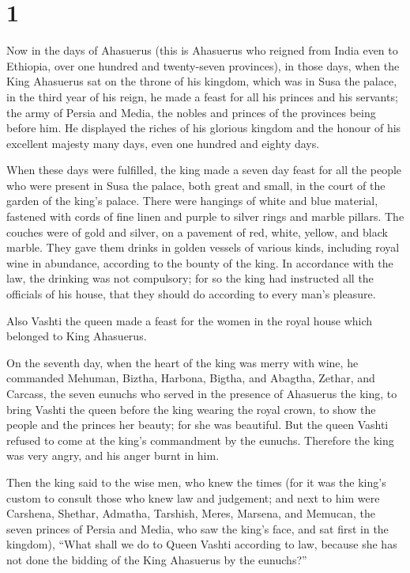 \hypertarget{section}{%
\section{1}\label{section}}

 Now in the days of Ahasuerus (this is Ahasuerus who
reigned from India even to Ethiopia, over one hundred and twenty-seven
provinces),  in those days, when the King Ahasuerus sat on
the throne of his kingdom, which was in Susa the palace, 
in the third year of his reign, he made a feast for all his princes and
his servants; the army of Persia and Media, the nobles and princes of
the provinces being before him.  He displayed the riches
of his glorious kingdom and the honour of his excellent majesty many
days, even one hundred and eighty days.

 When these days were fulfilled, the king made a seven day
feast for all the people who were present in Susa the palace, both great
and small, in the court of the garden of the king's palace.
 There were hangings of white and blue material, fastened
with cords of fine linen and purple to silver rings and marble pillars.
The couches were of gold and silver, on a pavement of red, white,
yellow, and black marble.  They gave them drinks in golden
vessels of various kinds, including royal wine in abundance, according
to the bounty of the king.  In accordance with the law,
the drinking was not compulsory; for so the king had instructed all the
officials of his house, that they should do according to every man's
pleasure.

 Also Vashti the queen made a feast for the women in the
royal house which belonged to King Ahasuerus.

 On the seventh day, when the heart of the king was merry
with wine, he commanded Mehuman, Biztha, Harbona, Bigtha, and Abagtha,
Zethar, and Carcass, the seven eunuchs who served in the presence of
Ahasuerus the king,  to bring Vashti the queen before the
king wearing the royal crown, to show the people and the princes her
beauty; for she was beautiful.  But the queen Vashti
refused to come at the king's commandment by the eunuchs. Therefore the
king was very angry, and his anger burnt in him.

 Then the king said to the wise men, who knew the times
(for it was the king's custom to consult those who knew law and
judgement;  and next to him were Carshena, Shethar,
Admatha, Tarshish, Meres, Marsena, and Memucan, the seven princes of
Persia and Media, who saw the king's face, and sat first in the
kingdom),  ``What shall we do to Queen Vashti according
to law, because she has not done the bidding of the King Ahasuerus by
the eunuchs?''

